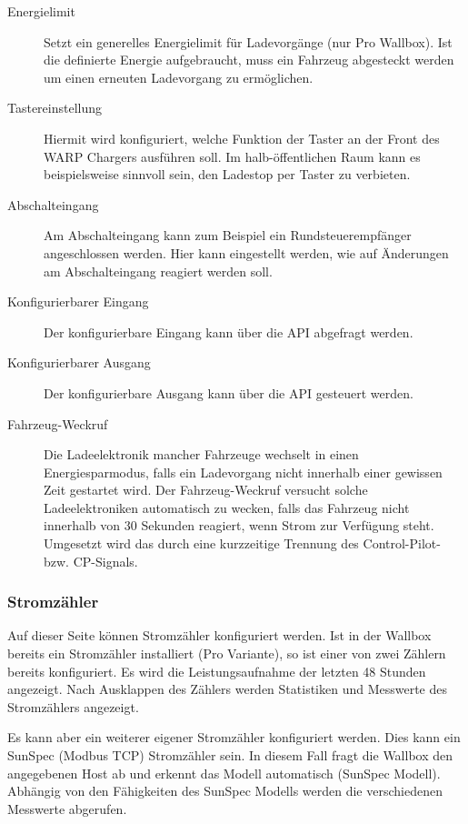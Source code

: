 \documentclass[a4paper,10pt]{article}
\begin{document}
\begin{multicols*}{2}
\begin{description}
     \item[Energielimit] Setzt ein generelles Energielimit für Ladevorgänge (nur Pro Wallbox). Ist die definierte Energie aufgebraucht, muss ein Fahrzeug abgesteckt werden um einen erneuten Ladevorgang zu ermöglichen.
     \item[Tastereinstellung] Hiermit wird konfiguriert, welche Funktion der Taster an der Front
     des WARP Chargers ausführen soll. Im halb-öffentlichen Raum kann es beispielsweise sinnvoll sein,
     den Ladestop per Taster zu verbieten.
     \item[Abschalteingang] Am Abschalteingang kann zum Beispiel ein Rundsteuerempfänger angeschlossen werden.
     Hier kann eingestellt werden, wie auf Änderungen am Abschalteingang reagiert werden soll.
     \item[Konfigurierbarer Eingang] Der konfigurierbare Eingang kann über die API abgefragt werden.
     \item[Konfigurierbarer Ausgang] Der konfigurierbare Ausgang kann über die API gesteuert werden.
     \item[Fahrzeug-Weckruf] Die Ladeelektronik mancher Fahrzeuge wechselt in einen Energiesparmodus, falls ein Ladevorgang nicht innerhalb einer gewissen Zeit gestartet wird. Der Fahrzeug-Weckruf versucht solche Ladeelektroniken automatisch zu wecken, falls das Fahrzeug nicht innerhalb von 30 Sekunden reagiert, wenn Strom zur Verfügung steht. Umgesetzt wird das durch eine kurzzeitige Trennung des Control-Pilot- bzw. CP-Signals.
    \end{description}

     \vfill
     \null

    \columnbreak

    \subsubsection{Stromzähler}
    Auf dieser Seite können Stromzähler konfiguriert werden. Ist in der Wallbox
    bereits ein Stromzähler installiert (Pro Variante), so ist einer von zwei
    Zählern bereits konfiguriert. Es wird die Leistungsaufnahme der letzten 48
    Stunden angezeigt. Nach Ausklappen des Zählers werden Statistiken und
    Messwerte des Stromzählers angezeigt.

    Es kann aber ein weiterer eigener Stromzähler konfiguriert werden. Dies kann
    ein SunSpec (Modbus TCP) Stromzähler sein. In diesem Fall fragt die Wallbox
    den angegebenen Host ab und erkennt das Modell automatisch (SunSpec Modell).
    Abhängig von den Fähigkeiten des SunSpec Modells werden die verschiedenen
    Messwerte abgerufen.


\end{multicols*}
\end{document}
